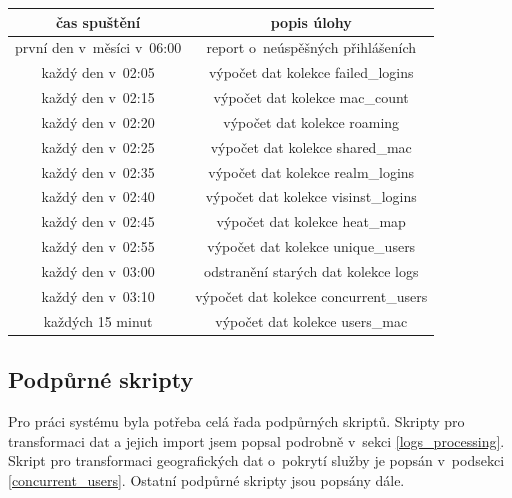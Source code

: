 \documentclass[thesis=M,czech]{FITthesis}[2012/06/26]
\begin{document}
      \begin{center}
        \begin{tabular}{ | c | c | }
          \hline
             čas spuštění                 & popis úlohy                            \\ \hline
             první den v~měsíci v~06:00   & report o~neúspěšných přihlášeních      \\ \hline
             každý den v~02:05            & výpočet dat kolekce failed\_logins     \\ \hline
             každý den v~02:15            & výpočet dat kolekce mac\_count         \\ \hline
             každý den v~02:20            & výpočet dat kolekce roaming            \\ \hline
             každý den v~02:25            & výpočet dat kolekce shared\_mac        \\ \hline
             každý den v~02:35            & výpočet dat kolekce realm\_logins      \\ \hline
             každý den v~02:40            & výpočet dat kolekce visinst\_logins    \\ \hline
             každý den v~02:45            & výpočet dat kolekce heat\_map          \\ \hline
             každý den v~02:55            & výpočet dat kolekce unique\_users      \\ \hline
             každý den v~03:00            & odstranění starých dat kolekce logs    \\ \hline
             každý den v~03:10            & výpočet dat kolekce concurrent\_users  \\ \hline
             každých 15 minut             & výpočet dat kolekce users\_mac         \\
          \hline
        \end{tabular}
      \end{center}

    \subsection{Podpůrné skripty}
      
      Pro práci systému byla potřeba celá řada podpůrných skriptů.
      Skripty pro transformaci dat a jejich import jsem popsal podrobně v~sekci \ref{logs_processing}.
      Skript pro transformaci geografických dat o~pokrytí služby je popsán v~podsekci \ref{concurrent_users}.
      Ostatní podpůrné skripty jsou popsány dále.
\end{document}
